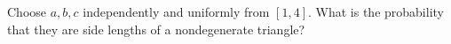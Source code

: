 Choose $a,b,c$ independently and uniformly from $[1,4]$. What is the probability that they are side lengths of a nondegenerate triangle?
